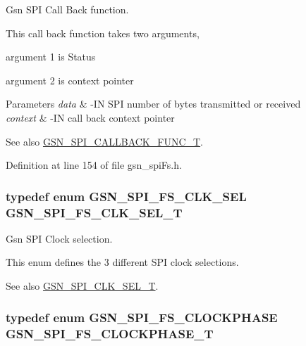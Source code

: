 Gsn SPI Call Back function. 

This call back function takes two arguments,
\begin{DoxyItemize}
\item argument 1 is Status
\item argument 2 is context pointer
\end{DoxyItemize}


\begin{DoxyParams}{Parameters}
{\em data} & -\/IN SPI number of bytes transmitted or received \\
\hline
{\em context} & -\/IN call back context pointer \\
\hline
\end{DoxyParams}
\begin{DoxySeeAlso}{See also}
\hyperlink{a00655_gad27c6db61273e0b521637db94b638cdb}{GSN\_\-SPI\_\-CALLBACK\_\-FUNC\_\-T}. 
\end{DoxySeeAlso}


Definition at line 154 of file gsn\_\-spiFs.h.

\hypertarget{a00655_ga0d31f3f2784c160b1ad748b232f4ae7b}{
\subsubsection[{GSN\_\-SPI\_\-FS\_\-CLK\_\-SEL\_\-T}]{\setlength{\rightskip}{0pt plus 5cm}typedef enum {\bf GSN\_\-SPI\_\-FS\_\-CLK\_\-SEL} {\bf GSN\_\-SPI\_\-FS\_\-CLK\_\-SEL\_\-T}}}
\label{a00655_ga0d31f3f2784c160b1ad748b232f4ae7b}


Gsn SPI Clock selection. 

This enum defines the 3 different SPI clock selections. \begin{DoxySeeAlso}{See also}
\hyperlink{a00655_gac4a300710a224a1971e5a78eae8eb89e}{GSN\_\-SPI\_\-CLK\_\-SEL\_\-T}. 
\end{DoxySeeAlso}
\hypertarget{a00655_gaf3bb2adb7491e3d235c486d48f1b506d}{
\subsubsection[{GSN\_\-SPI\_\-FS\_\-CLOCKPHASE\_\-T}]{\setlength{\rightskip}{0pt plus 5cm}typedef enum {\bf GSN\_\-SPI\_\-FS\_\-CLOCKPHASE}  {\bf GSN\_\-SPI\_\-FS\_\-CLOCKPHASE\_\-T}}}
\label{a00655_gaf3bb2adb7491e3d235c486d48f1b506d}


